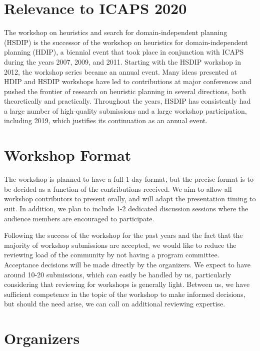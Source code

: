 \documentclass[10pt]{article}
\begin{document}

\section*{Relevance to ICAPS 2020}

The workshop on heuristics and search for domain-independent planning (HSDIP) is
the successor of the workshop on heuristics for domain-independent planning
(HDIP), a biennial event that took place in conjunction with ICAPS during the
years 2007, 2009, and 2011. Starting with the HSDIP workshop in 2012, the
workshop series became an annual event.
Many ideas presented at HDIP and HSDIP workshops have led to contributions at
major conferences and pushed the frontier of research on heuristic planning in
several directions, both theoretically and practically.
Throughout the years, HSDIP has consistently had a large number of
high-quality submissions and a large workshop participation, including 2019,
which justifies its continuation as an annual event.

\section*{Workshop Format}

The workshop is planned to have a full 1-day format, but the precise
format is to be decided as a function of the contributions received.
We aim to allow all workshop contributors to present orally, and will
adapt the presentation timing to suit. In addition, we plan to include
1-2 dedicated discussion sessions where the audience members are
encouraged to participate.

Following the success of the workshop for the past years and the fact
that the majority of workshop submissions are accepted, we would like to reduce
the reviewing load of the community by not having a program
committee. Acceptance decisions will be made directly by the
organizers. We expect to have around 10-20 submissions, which can
easily be handled by us, particularly considering that reviewing for
workshops is generally light. Between us, we have sufficient
competence in the topic of the workshop to make informed decisions,
but should the need arise, we can call on additional reviewing
expertise.

\section*{Organizers}
\end{document}

